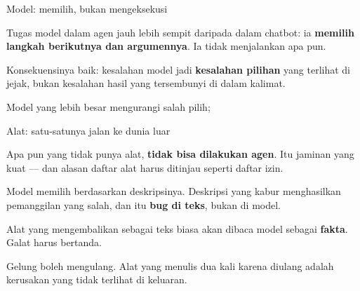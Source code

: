 \documentclass[aspectratio=169,11pt,t]{beamer}
\begin{document}
\begin{frame}[shrink=25]{Model: memilih, bukan mengeksekusi}
{\fontsize{9.4}{12.6}\selectfont\color{fg2}Tugas model dalam agen jauh lebih sempit daripada dalam chatbot: ia \textbf{memilih langkah berikutnya dan argumennya}. Ia tidak menjalankan apa pun.\par}\vskip 4pt
{\fontsize{9.4}{12.6}\selectfont\color{fg2}Konsekuensinya baik: kesalahan model jadi \textbf{kesalahan pilihan} yang terlihat di jejak, bukan kesalahan hasil yang tersembunyi di dalam kalimat.\par}\vskip 4pt
\begin{iband}[signal]
Model yang lebih besar mengurangi salah pilih; 
\end{iband}
\end{frame}

\begin{frame}[shrink=25]{Alat: satu-satunya jalan ke dunia luar}
\begin{minipage}[t]{0.494\textwidth}
\begin{icardgood}
Apa pun yang tidak punya alat, \textbf{tidak bisa dilakukan agen}. Itu jaminan yang kuat --- dan alasan daftar alat harus ditinjau seperti daftar izin.
\end{icardgood}
\end{minipage}%
\hfill
\begin{minipage}[t]{0.494\textwidth}
\begin{icardwarn}
Model memilih berdasarkan deskripsinya. Deskripsi yang kabur menghasilkan pemanggilan yang salah, dan itu \textbf{bug di teks}, bukan di model.
\end{icardwarn}
\end{minipage}%


\vskip 4pt

\begin{minipage}[t]{0.494\textwidth}
\begin{icardbad}
Alat yang mengembalikan  sebagai teks biasa akan dibaca model sebagai \textbf{fakta}. Galat harus bertanda.
\end{icardbad}
\end{minipage}%
\hfill
\begin{minipage}[t]{0.494\textwidth}
\begin{icardbad}
Gelung boleh mengulang. Alat yang menulis dua kali karena diulang adalah kerusakan yang tidak terlihat di keluaran.
\end{icardbad}
\end{minipage}%
\end{frame}
\end{document}
